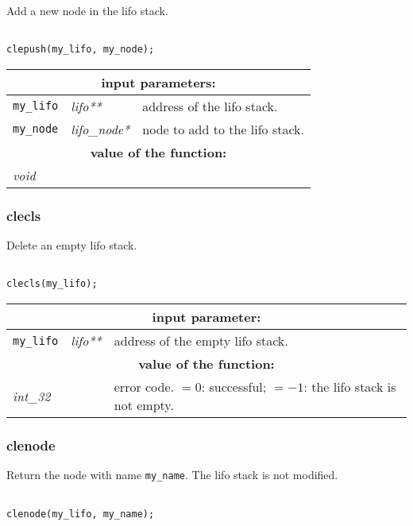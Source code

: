 Add a new node in the lifo stack.

\begin{verbatim}

clepush(my_lifo, my_node);
\end{verbatim}

\noindent
\begin{tabular}{|p{1.5cm}|p{2cm}|p{11cm}|}
\hline
\multicolumn{3}{|c|}{\bf input parameters:} \\
\hline
{\tt my\_lifo} & {\it lifo**} & address of the lifo stack. \\
\hline
{\tt my\_node} & {\it lifo\_node*} & node to add to the lifo stack. \\
\hline
\multicolumn{3}{|c|}{\bf value of the function:} \\
\hline
\multicolumn{2}{|l|}{\it void} &  \\
\hline
\end{tabular}

\subsubsection{clecls}

Delete an empty lifo stack.

\begin{verbatim}

clecls(my_lifo);
\end{verbatim}

\noindent
\begin{tabular}{|p{1.5cm}|p{2cm}|p{11cm}|}
\hline
\multicolumn{3}{|c|}{\bf input parameter:} \\
\hline
{\tt my\_lifo} & {\it lifo**} & address of the empty lifo stack. \\
\hline
\multicolumn{3}{|c|}{\bf value of the function:} \\
\hline
\multicolumn{2}{|l|}{\it int\_32} & error code. $=0$: successful; $=-1$: the lifo stack is not empty. \\
\hline
\end{tabular}

\subsubsection{clenode}

Return the node with name {\tt my\_name}. The lifo stack is not modified.
\begin{verbatim}

clenode(my_lifo, my_name);
\end{verbatim}

